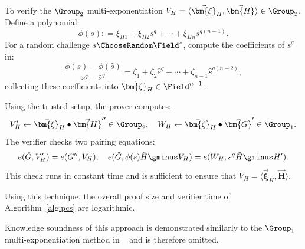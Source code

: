 To verify the $\Group_2$ multi-exponentiation $V_H = \langle \vec{\bm{\xi}}_H, \vec{\bm{H}} \rangle \in \Group_2$.
Define a polynomial:
\[
	\phi(s): = \xi_{H1} + \xi_{H2}s^q + \cdots + \xi_{Hn} s^{q(n - 1)}.
\]
For a random challenge $s \ChooseRandom \Field^*$, compute the coefficients of $\hat{s}^q$ in:
\[
	\frac{\phi(s) - \phi(\hat{s})}{s^q - \hat{s}^q} = \zeta_1 + \zeta_2 \hat{s}^q + \cdots + \zeta_{n - 1} \hat{s}^{q(n 
 - 2)},
\]
collecting these coefficients into $\vec{\bm{\zeta}}_H \in \Field^{n - 1} $.

Using the trusted setup, the prover computes:
\[
	V_H' \leftarrow \vec{\bm{\xi}}_H \bullet \vec{\bm{H}}'' \in \Group_2, \quad
	W_H \leftarrow \vec{\bm{\zeta}}_H \bullet \vec{\bm{G}}' \in \Group_1.
\]
The verifier checks two pairing equations:
\[
	e(\hat{G}, V_H') = e(G'', V_H), \quad
	e(\hat{G}, \phi(s)\hat{H} \gminus V_H) = e(W_H, s^q \hat{H} \gminus H').
\]
This check runs in constant time and is sufficient to ensure that $V_H = \langle \vec{\bm{\xi}}_H, \vec{\bm{H}} \rangle$.

Using this technique, the overall proof size and verifier time of
Algorithm~\ref{alg:pcs} are logarithmic.

Knowledge soundness of this approach is demonstrated similarly to the $\Group_1$ multi-exponentiation method in ~\cite[Appendix A.1]{asiaccs/CongYY24} and is therefore omitted.

